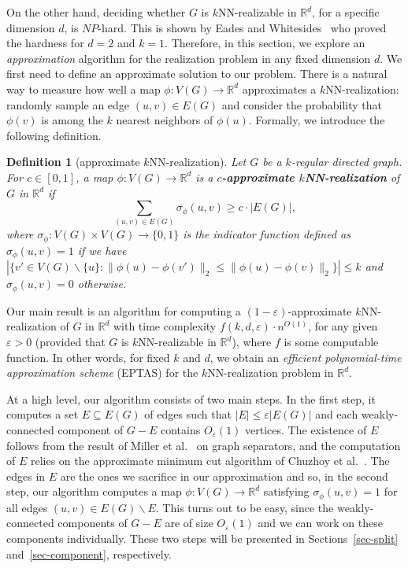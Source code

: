 \documentclass[11pt]{article}
\newtheorem{definition}{Definition}
\begin{document}
On the other hand, deciding whether $G$ is $k$NN-realizable in $\mathbb{R}^d$, for a specific dimension $d$, is $NP$-hard. This is shown by Eades and Whitesides~\cite{eades:1996} who proved the hardness for $d=2$ and $k=1$.
Therefore, in this section, we explore an \textit{approximation} algorithm for the realization problem in any fixed dimension $d$.
We first need to define an approximate solution to our problem.
There is a natural way to measure how well a map $\phi: V(G) \rightarrow \mathbb{R}^d$ approximates a $k$NN-realization: randomly sample an edge $(u,v) \in E(G)$ and consider the probability that $\phi(v)$ is among the $k$ nearest neighbors of $\phi(u)$.
Formally, we introduce the following definition.
\begin{definition}[approximate $k$NN-realization] \label{def-apprxreal}
Let $G$ be a $k$-regular directed graph.
For $c \in [0,1]$, a map $\phi:V(G) \rightarrow \mathbb{R}^d$ is a \textbf{$c$-approximate $k$NN-realization} of $G$ in $\mathbb{R}^d$ if 
\begin{equation*}
    \sum_{(u,v) \in E(G)} \sigma_\phi(u,v) \geq c \cdot |E(G)|,
\end{equation*}
where $\sigma_\phi: V(G) \times V(G) \rightarrow \{0,1\}$ is the indicator function defined as $\sigma_\phi(u,v) = 1$ if we have $|\{v' \in V(G) \backslash \{u\}: \lVert \phi(u)-\phi(v') \rVert_2 \leq \lVert \phi(u)-\phi(v) \rVert_2 \}| \leq k$ and $\sigma_\phi(u,v) = 0$ otherwise.
\end{definition}

Our main result is an algorithm for computing a $(1-\varepsilon)$-approximate $k$NN-realization of $G$ in $\mathbb{R}^d$ with time complexity $f(k,d,\varepsilon) \cdot n^{O(1)}$, for any given $\varepsilon > 0$ (provided that $G$  is $k$NN-realizable in $\mathbb{R}^d$), where $f$ is some computable function.
In other words, for fixed $k$ and $d$, we obtain an \textit{efficient polynomial-time approximation scheme} (EPTAS) for the $k$NN-realization problem in $\mathbb{R}^d$.

At a high level, our algorithm consists of two main steps.
In the first step, it computes a set $E \subseteq E(G)$ of edges such that $|E| \leq \varepsilon |E(G)|$ and each weakly-connected component of $G - E$ contains $O_\varepsilon(1)$ vertices.
The existence of $E$ follows from the result of Miller et al.~\cite{miller:1997} on graph separators, and the computation of $E$ relies on the approximate minimum cut algorithm of Chuzhoy et al.~\cite{chuzhoy2020deterministic}.
The edges in $E$ are the ones we sacrifice in our approximation and so, in the second step, our algorithm computes a map $\phi:V(G) \rightarrow \mathbb{R}^d$ satisfying $\sigma_\phi(u,v) = 1$ for all edges $(u,v) \in E(G) \backslash E$.
This turns out to be easy, since the weakly-connected components of $G - E$ are of size $O_\varepsilon(1)$ and we can work on these components individually.
These two steps will be presented in Sections~\ref{sec-split} and~\ref{sec-component}, respectively.
\end{document}
